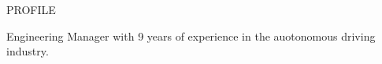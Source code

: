 \documentclass{resume} %
\begin{document}

\begin{rSection}{PROFILE}

\vspace{-.2in}
\item[] Engineering Manager with 9 years of experience in the auotonomous driving industry.

\end{rSection}




\end{document}
